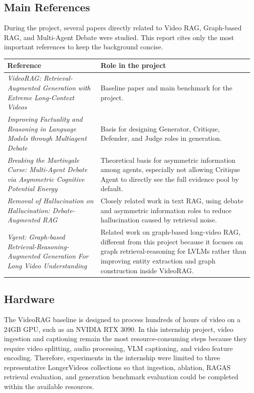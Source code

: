 \documentclass[12pt,a4paper]{article}
\begin{document}
\subsection{Main References}

During the project, several papers directly related to Video RAG, Graph-based RAG, and Multi-Agent Debate were studied. This report cites only the most important references to keep the background concise.

\begin{center}
\small
\begin{tabular}{p{}p{}}
\toprule
\textbf{Reference} & \textbf{Role in the project} \\
\midrule
\textit{VideoRAG: Retrieval-Augmented Generation with Extreme Long-Context Videos} \cite{ren2025videorag} & Baseline paper and main benchmark for the project. \\
\textit{Improving Factuality and Reasoning in Language Models through Multiagent Debate} \cite{du2023multiagent} & Basis for designing Generator, Critique, Defender, and Judge roles in generation. \\
\textit{Breaking the Martingale Curse: Multi-Agent Debate via Asymmetric Cognitive Potential Energy} \cite{liu2026martingale} & Theoretical basis for asymmetric information among agents, especially not allowing Critique Agent to directly see the full evidence pool by default. \\
\textit{Removal of Hallucination on Hallucination: Debate-Augmented RAG} \cite{hu2025drag} & Closely related work in text RAG, using debate and asymmetric information roles to reduce hallucination caused by retrieval noise. \\
\textit{Vgent: Graph-based Retrieval-Reasoning-Augmented Generation For Long Video Understanding} \cite{shen2025vgent} & Related work on graph-based long-video RAG, different from this project because it focuses on graph retrieval-reasoning for LVLMs rather than improving entity extraction and graph construction inside VideoRAG. \\
\bottomrule
\end{tabular}
\end{center}

\subsection{Hardware}

The VideoRAG baseline is designed to process hundreds of hours of video on a 24GB GPU, such as an NVIDIA RTX 3090. In this internship project, video ingestion and captioning remain the most resource-consuming steps because they require video splitting, audio processing, VLM captioning, and video feature encoding. Therefore, experiments in the internship were limited to three representative LongerVideos collections so that ingestion, ablation, RAGAS retrieval evaluation, and generation benchmark evaluation could be completed within the available resources.
\end{document}
